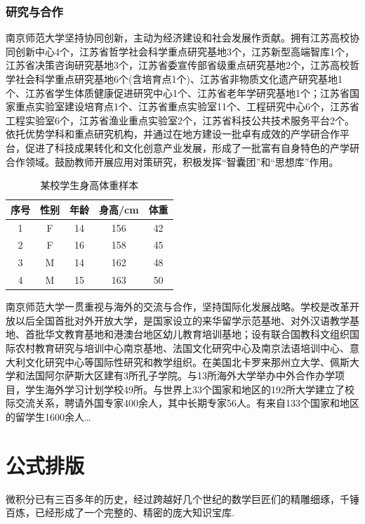 \documentclass[UTF8,a4paper,twoside,zihao=-4]{ctexrep}
\theoremstyle{nonumberplain}
\begin{document}
\subsection{研究与合作}
南京师范大学坚持协同创新，主动为经济建设和社会发展作贡献。拥有江苏高校协同创新中心4个，江苏省哲学社会科学重点研究基地3个，江苏新型高端智库1个，江苏省决策咨询研究基地3个，江苏省委宣传部省级重点研究基地2个，江苏高校哲学社会科学重点研究基地6个(含培育点1个)、江苏省非物质文化遗产研究基地1个、江苏省学生体质健康促进研究中心1个、江苏省老年学研究基地1个；江苏省国家重点实验室建设培育点1个、江苏省重点实验室11个、工程研究中心6个，江苏省工程实验室6个，江苏省渔业重点实验室2个，江苏省科技公共技术服务平台2个。依托优势学科和重点研究机构，并通过在地方建设一批卓有成效的产学研合作平台，促进了科技成果转化和文化创意产业发展，形成了一批富有自身特色的产学研合作领域。鼓励教师开展应用对策研究，积极发挥“智囊团”和“思想库”作用。
\begin{table}[htb]\caption{某校学生身高体重样本}\label{tb:hw}
\centering{}
\begin{tabular}{ccccc}
	\toprule
	序号 & 性别 & 年龄 & 身高/cm & 体重 \\
	\midrule
	1 & F & 14 & 156 &42 \\
	2 & F & 16 & 158 & 45 \\
	3 & M & 14 & 162 & 48 \\
	4 & M & 15 & 163 & 50 \\
	\bottomrule 
\end{tabular}
\end{table}

南京师范大学一贯重视与海外的交流与合作，坚持国际化发展战略。学校是改革开放以后全国首批对外开放大学，是国家设立的来华留学示范基地、对外汉语教学基地、首批华文教育基地和港澳台地区幼儿教育培训基地；设有联合国教科文组织国际农村教育研究与培训中心南京基地、法国文化研究中心及南京法语培训中心、意大利文化研究中心等国际性研究和教学组织。在美国北卡罗来那州立大学、佩斯大学和法国阿尔萨斯大区建有3所孔子学院。与13所海外大学举办中外合作办学项目，学生海外学习计划学校49所。与世界上33个国家和地区的192所大学建立了校际交流关系，聘请外国专家400余人，其中长期专家56人。有来自133个国家和地区的留学生1600余人\dots

\chapter{公式排版}
微积分已有三百多年的历史，经过跨越好几个世纪的数学巨匠们的精雕细琢，千锤百炼，已经形成了一个完整的、精密的庞大知识宝库\citep{CS2016}.
\end{document}

